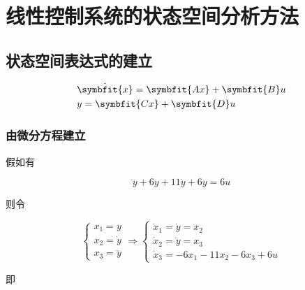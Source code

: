 \section{线性控制系统的状态空间分析方法}

\subsection{状态空间表达式的建立}

\begin{align}
    & \dot{\symbfit{x}} = \symbfit{Ax} + \symbfit{B}u \\
    & y = \symbfit{Cx} + \symbfit{D}u
\end{align}

\subsubsection{由微分方程建立}

假如有

\begin{equation*}
    \dddot{y} + 6\ddot{y} + 11\dot{y} + 6y = 6u
\end{equation*}

则令

\begin{equation*}
    \begin{cases}
        x_1 = y \\ 
        x_2 = \dot{y} \\
        x_3 = \ddot{y}
    \end{cases} \Rightarrow \begin{cases}
        \dot{x}_1 = \dot{y} = x_2 \\
        \dot{x}_2 = \ddot{y} = x_3 \\
        \dot{x}_3 = -6x_1 - 11x_2 - 6x_3 + 6u
    \end{cases}
\end{equation*}

即

